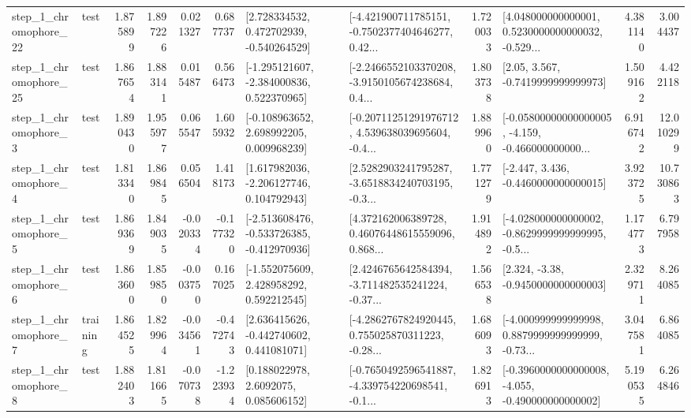 \begin{tabular}{llrrrrllrlrr}
    step\_1\_chromophore\_22 &      test &      1.875899 &    1.897226 &      0.021327 &  0.687737 &    [2.728334532, 0.472702939, -0.540264529] &  [-4.421900711785151, -0.7502377404646277, 0.42... &       1.720033 &  [4.048000000000001, 0.5230000000000032, -0.529... &            4.381140 &          3.004437 \\
    step\_1\_chromophore\_25 &      test &      1.867654 &    1.883141 &      0.015487 &  0.566473 &   [-1.295121607, -2.384000836, 0.522370965] &  [-2.2466552103370208, -3.9150105674238684, 0.4... &       1.803738 &                 [2.05, 3.567, -0.7419999999999973] &            1.509162 &          4.422118 \\
     step\_1\_chromophore\_3 &      test &      1.890430 &    1.955977 &      0.065547 &  1.605932 &    [-0.108963652, 2.698992205, 0.009968239] &  [-0.20711251291976712, 4.539638039695604, -0.4... &       1.889960 &  [-0.05800000000000005, -4.159, -0.466000000000... &            6.916742 &         12.010299 \\
     step\_1\_chromophore\_4 &      test &      1.813340 &    1.869845 &      0.056504 &  1.418173 &    [1.617982036, -2.206127746, 0.104792943] &  [2.5282903241795287, -3.6518834240703195, -0.3... &       1.771279 &               [-2.447, 3.436, -0.4460000000000015] &            3.923725 &         10.730863 \\
     step\_1\_chromophore\_5 &      test &      1.869369 &    1.849035 &     -0.020334 & -0.177320 &  [-2.513608476, -0.533726385, -0.412970936] &  [4.372162006389728, 0.46076448615559096, 0.868... &       1.914892 &  [-4.028000000000002, -0.8629999999999995, -0.5... &            1.174773 &          6.797958 \\
     step\_1\_chromophore\_6 &      test &      1.863600 &    1.859850 &     -0.003750 &  0.167025 &    [-1.552075609, 2.428958292, 0.592212545] &  [2.4246765642584394, -3.711482535241224, -0.37... &       1.566538 &                [2.324, -3.38, -0.9450000000000003] &            2.329711 &          8.264085 \\
     step\_1\_chromophore\_7 &  training &      1.864525 &    1.829964 &     -0.034561 & -0.472743 &    [2.636415626, -0.442740602, 0.441081071] &  [-4.2862767824920445, 0.755025870311223, -0.28... &       1.686093 &  [-4.000999999999998, 0.8879999999999999, -0.73... &            3.047581 &          6.864085 \\
     step\_1\_chromophore\_8 &      test &      1.882403 &    1.811665 &     -0.070738 & -1.223934 &       [0.188022978, 2.6092075, 0.085606152] &  [-0.7650492596541887, -4.339754220698541, -0.1... &       1.826913 &  [-0.3960000000000008, -4.055, -0.490000000000002] &            5.190535 &          6.264846 \\

\end{tabular}

